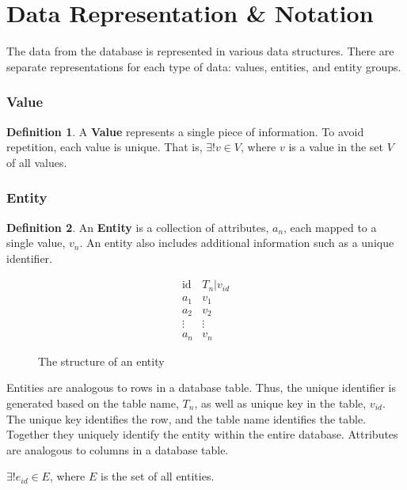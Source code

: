 \documentclass[12pt,letterpaper,oneside,notitlepage]{report}
\theoremstyle{definition}
\newtheorem{defn}{Definition}
\begin{document}
		\section{Data Representation \& Notation}
		\label{sec:data-rep-and-notation}
			The data from the database is represented in various data structures.  There are separate representations for each type of data:  values, entities, and entity groups.

				\subsubsection{Value}
					\begin{defn}
						A \textbf{Value} represents a single piece of information.  To avoid repetition, each value is unique.  That is, $\exists! v \in V$, where $v$ is a value in the set $V$ of all values.
					\end{defn}

				\subsubsection{Entity}
					\begin{defn}
						An \textbf{Entity} is a collection of attributes, $a_n$, each mapped to a single value, $v_n$.  An entity also includes additional information such as a unique identifier.

						\begin{figure}[!ht]
							\centering
							\[
								\begin{array}{ll}
									\mathrm{id} & T_n|v_{id} \\
									a_1 & v_1 \\
									a_2 & v_2 \\
									\vdots & \vdots \\
									a_n & v_n
								\end{array}
							\]
							\caption{The structure of an entity}
							\label{fig:entity-rep}
						\end{figure}

						Entities are analogous to rows in a database table.  Thus, the unique identifier is generated based on the table name, $T_n$, as well as unique key in the table, $v_{id}$.  The unique key identifies the row, and the table name identifies the table.  Together they uniquely identify the entity within the entire database.  Attributes are analogous to columns in a database table.

						$\exists! e_{id} \in E$, where $E$ is the set of all entities.
					\end{defn}
\end{document}
